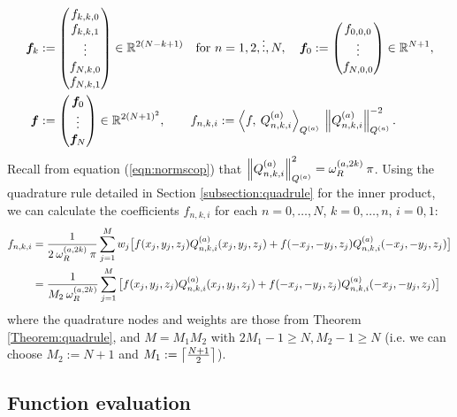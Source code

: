 \documentclass[11pt, oneside]{article}   	%
\begin{document}
\begin{align*}
	\bm{f}_k &:= 
		\begin{pmatrix}
			f_{k,k,0} \\
			f_{k,k,1} \\
			\vdots \\
			f_{N,k,0} \\
			f_{N,k,1}
		\end{pmatrix} \in \R^{2(N-k+1)} \quad \text{for } n = 1,2,\dots,N, \quad
	\bm{f}_0 := 
		\begin{pmatrix}
			f_{0,0,0} \\
			\vdots \\
			f_{N,0,0}
		\end{pmatrix} \in \R^{N+1}, \\
	\bm{f} &:= 
		\begin{pmatrix}
			\bm{f}_0 \\
			\vdots \\
			\bm{f}_N
		\end{pmatrix} \in \R^{2(N+1)^2}, \quad \quad
	f_{n,k,i} := \ip< f, \: \scopnkia>_{\scopa} \: \norm{\scopnkia}^{-2}_{\scopa}.
\end{align*}
Recall from equation (\ref{eqn:normscop}) that $\left\| Q_{n,k,i}^{(a)} \right\|^2_{Q^{(a)}} = \omega_R^{(a,2k)} \: \pi$. Using the quadrature rule detailed in Section \ref{subsection:quadrule} for the inner product, we can calculate the coefficients $f_{n,k,i}$ for each $n = 0,\dots,N$, $k = 0,\dots,n$, $i = 0,1$: 
\begin{align*}
	f_{n,k,i} &= \frac{1}{2 \: \omega_R^{(a,2k)} \: \pi} \sum_{j=1}^{M} w_j \big[ f(x_j, y_j, z_j) Q_{n,k,i}^{(a)}(x_j, y_j, z_j) +f(-x_j, -y_j, z_j) Q_{n,k,i}^{(a)}(-x_j, -y_j, z_j) \big] \\
	&= \frac{1}{M_2 \: \omega_R^{(a,2k)}} \sum_{j=1}^{M} \big[ f(x_j, y_j, z_j) Q_{n,k,i}^{(a)}(x_j, y_j, z_j) +f(-x_j, -y_j, z_j) Q_{n,k,i}^{(a)}(-x_j, -y_j, z_j) \big]
\end{align*}
where the quadrature nodes and weights are those from Theorem \ref{Theorem:quadrule}, and $M = M_1 M_2$ with $2M_1 - 1 \ge N, M_2 - 1 \ge N$ (i.e. we can choose $M_2 := N + 1$ and $M_1 := \left\lceil\frac{N+1}{2}\right\rceil$).



\subsection{Function evaluation}\label{subsection:functionevaluation}
\end{document}
